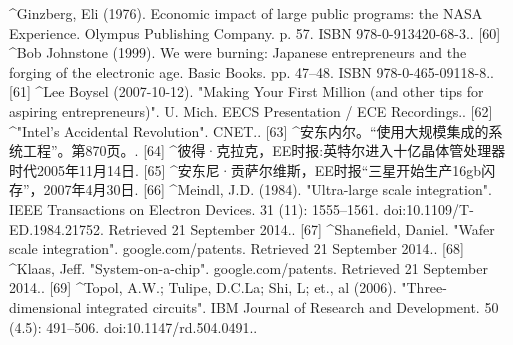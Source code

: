 \begin{enumerate}
[59]
^Ginzberg, Eli (1976). Economic impact of large public programs: the NASA Experience. Olympus Publishing Company. p. 57. ISBN 978-0-913420-68-3..
[60]
^Bob Johnstone (1999). We were burning: Japanese entrepreneurs and the forging of the electronic age. Basic Books. pp. 47–48. ISBN 978-0-465-09118-8..
[61]
^Lee Boysel (2007-10-12). "Making Your First Million (and other tips for aspiring entrepreneurs)". U. Mich. EECS Presentation / ECE Recordings..
[62]
^"Intel's Accidental Revolution". CNET..
[63]
^安东内尔。“使用大规模集成的系统工程”。第870页。.
[64]
^彼得·克拉克，EE时报:英特尔进入十亿晶体管处理器时代2005年11月14日.
[65]
^安东尼·贡萨尔维斯，EE时报“三星开始生产16gb闪存”，2007年4月30日.
[66]
^Meindl, J.D. (1984). "Ultra-large scale integration". IEEE Transactions on Electron Devices. 31 (11): 1555–1561. doi:10.1109/T-ED.1984.21752. Retrieved 21 September 2014..
[67]
^Shanefield, Daniel. "Wafer scale integration". google.com/patents. Retrieved 21 September 2014..
[68]
^Klaas, Jeff. "System-on-a-chip". google.com/patents. Retrieved 21 September 2014..
[69]
^Topol, A.W.; Tulipe, D.C.La; Shi, L; et., al (2006). "Three-dimensional integrated circuits". IBM Journal of Research and Development. 50 (4.5): 491–506. doi:10.1147/rd.504.0491..
\end{enumerate}

